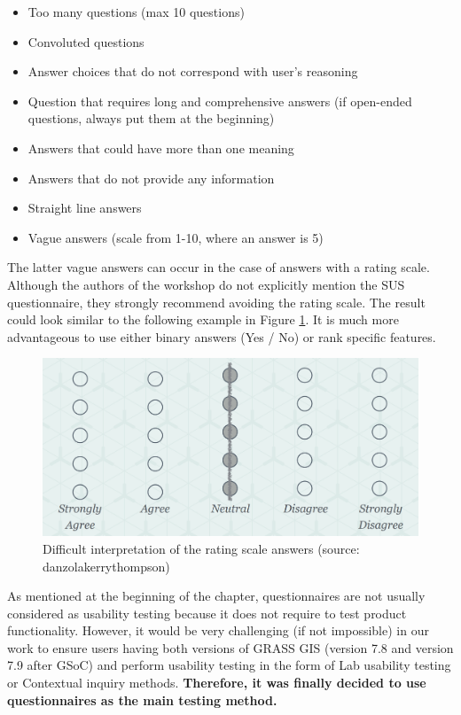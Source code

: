 \documentclass[a4paper,10pt,twoside]{article}
\begin{document}
\begin{itemize}
\item Too many questions (max 10 questions)
\item Convoluted questions
\item Answer choices that do not correspond with user's reasoning
\item Question that requires long and comprehensive answers (if open-ended questions, always put them at the beginning)
\item Answers that could have more than one meaning
\item Answers that do not provide any information
\item Straight line answers
\item Vague answers (scale from 1-10, where an answer is 5)
\end{itemize}

\noindent The latter vague answers can occur in the case of answers with a rating scale. Although the authors of the workshop do not explicitly mention the SUS questionnaire, they strongly recommend avoiding the rating scale. The result could look similar to the following example in Figure \ref{fig:blur_scale}. It is much more advantageous to use either binary answers (Yes / No) or rank specific features.

\vspace{0.3cm}
\begin{figure}[hbt!] 
\begin{center}
\includegraphics[width=12.5cm]{../pictures/blur_scale.png} 
\caption[Difficult interpretation of the rating scale answers]{Difficult interpretation of the rating scale answers (source: danzolakerrythompson)}
\label{fig:blur_scale}
\end{center}
\end{figure}

\noindent As mentioned at the beginning of the chapter, questionnaires are not usually considered as usability testing because it does not require to test product functionality. However, it would be very challenging (if not impossible) in our work to ensure users having both versions of GRASS GIS (version 7.8 and version 7.9 after GSoC) and perform usability testing in the form of Lab usability testing or Contextual inquiry methods. \textbf{Therefore, it was finally decided to use questionnaires as the main testing method.}
\end{document}
